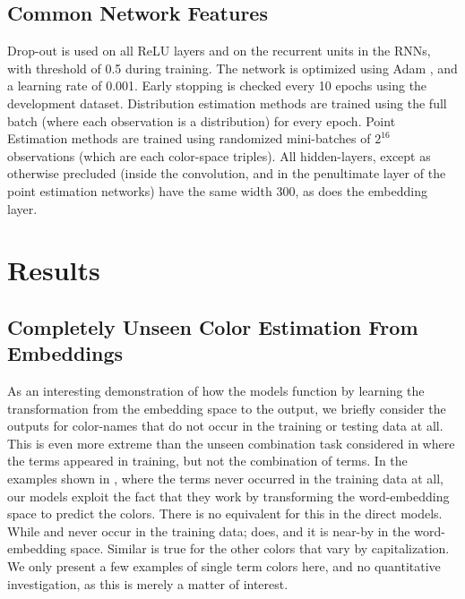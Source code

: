 \subsection{Common Network Features}
Drop-out \parencite{srivastava2014dropout}  is used on all ReLU layers and on the recurrent units in the RNNs, with threshold of 0.5 during training.
The network is optimized using Adam \parencite{kingma2014adam}, and a learning rate of 0.001.
Early stopping is checked every 10 epochs using the development dataset.
Distribution estimation methods are trained using the full batch (where each observation is a distribution) for every epoch.
Point Estimation methods are trained using randomized mini-batches of $2^{16}$ observations (which are each color-space triples).
All hidden-layers, except as otherwise precluded (inside the convolution, and in the penultimate layer of the point estimation networks) have the same width 300, as does the embedding layer.



\section{Results}\label{sec:results}





\subsection{Completely Unseen Color Estimation From Embeddings}\label{sec:embeddingonly}
As an interesting demonstration of how the models function by learning the transformation from the embedding space to the output, we briefly consider the outputs for color-names that do not occur in the training or testing data at all.
This is even more extreme than the unseen combination task considered in  where the terms appeared in training, but not the combination of terms.
In the examples shown in , where the terms never occurred in the training data at all, our models exploit the fact that they work by transforming the word-embedding space to predict the colors.
There is no equivalent for this in the direct models.
While  and  never occur in the training data;  does, and it is near-by in the word-embedding space.
Similar is true for the other colors that vary by capitalization.
We only present a few examples of single term colors here, and no quantitative investigation, as this is merely a matter of interest.

